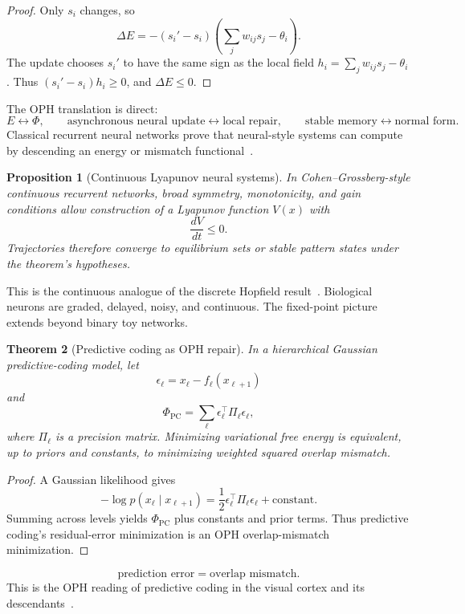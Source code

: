 \documentclass[11pt]{article}
\newtheorem{theorem}{Theorem}[section]
\newtheorem{proposition}[theorem]{Proposition}
\theoremstyle{remark}
\theoremstyle{plain}
\begin{document}
\begin{proof}
Only \(s_i\) changes, so
\[
\Delta E
=
-(s_i'-s_i)
\left(
\sum_jw_{ij}s_j-\theta_i
\right).
\]
The update chooses \(s_i'\) to have the same sign as the local field \(h_i=\sum_jw_{ij}s_j-\theta_i\). Thus \((s_i'-s_i)h_i\ge0\), and \(\Delta E\le0\).
\end{proof}

The OPH translation is direct:
\[
E\leftrightarrow\Phi,
\qquad
\text{asynchronous neural update}\leftrightarrow\text{local repair},
\qquad
\text{stable memory}\leftrightarrow\text{normal form}.
\]
Classical recurrent neural networks prove that neural-style systems can compute by descending an energy or mismatch functional~\cite{Hopfield1982}.

\begin{proposition}[Continuous Lyapunov neural systems]
In Cohen--Grossberg-style continuous recurrent networks, broad symmetry, monotonicity, and gain conditions allow construction of a Lyapunov function \(V(x)\) with
\[
\frac{dV}{dt}\le0.
\]
Trajectories therefore converge to equilibrium sets or stable pattern states under the theorem's hypotheses.
\end{proposition}

This is the continuous analogue of the discrete Hopfield result~\cite{CohenGrossberg1983}. Biological neurons are graded, delayed, noisy, and continuous. The fixed-point picture extends beyond binary toy networks.

\begin{theorem}[Predictive coding as OPH repair]
In a hierarchical Gaussian predictive-coding model, let
\[
\epsilon_\ell=x_\ell-f_\ell(x_{\ell+1})
\]
and
\[
\Phi_{\mathrm{PC}}
=
\sum_\ell \epsilon_\ell^\top\Pi_\ell\epsilon_\ell,
\]
where \(\Pi_\ell\) is a precision matrix. Minimizing variational free energy is equivalent, up to priors and constants, to minimizing weighted squared overlap mismatch.
\end{theorem}

\begin{proof}
A Gaussian likelihood gives
\[
-\log p(x_\ell\mid x_{\ell+1})
=
\frac12\epsilon_\ell^\top\Pi_\ell\epsilon_\ell+\mathrm{constant}.
\]
Summing across levels yields \(\Phi_{\mathrm{PC}}\) plus constants and prior terms. Thus predictive coding's residual-error minimization is an OPH overlap-mismatch minimization.
\end{proof}

\[
\boxed{
\text{prediction error}=\text{overlap mismatch}.
}
\]
This is the OPH reading of predictive coding in the visual cortex and its descendants~\cite{RaoBallard1999}.
\end{document}
